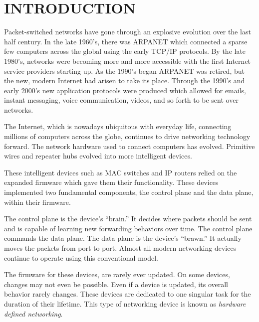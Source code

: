 \chapter{INTRODUCTION} \label{ch:intro}

%
%




Packet-switched networks have gone through an explosive evolution over the last half century. In the late 1960's, there was ARPANET which connected a sparse few computers across the global using the early TCP/IP protocols. By the late 1980's, networks were becoming more and more accessible with the first Internet service providers starting up. As the 1990's began ARPANET was retired, but the new, modern Internet had arisen to take its place. Through the 1990's and early 2000's new application protocols were produced which allowed for emails, instant messaging, voice communication, videos, and so forth to be sent over networks. 

The Internet, which is nowadays ubiquitous with everyday life, connecting millions of computers across the globe, continues to drive networking technology forward. The network hardware used to connect computers has evolved. Primitive wires and repeater hubs evolved into more intelligent devices. 

These intelligent devices such as MAC switches and IP routers relied on the expanded firmware which gave them their functionality. These devices implemented two fundamental components, the control plane and the data plane, within their firmware.

The control plane is the device's ``brain.'' It decides where packets should be sent and is capable of learning new forwarding behaviors over time. The control plane commands the data plane. The data plane is the device's ``brawn.'' It actually moves the packets from port to port. Almost all modern networking devices continue to operate using this conventional model.  

The firmware for these devices, are rarely ever updated. On some devices, changes may not even be possible. Even if a device is updated, its overall behavior rarely changes. These devices are dedicated to one singular task for the duration of their lifetime. This type of networking device is known as \emph{hardware defined networking}.

